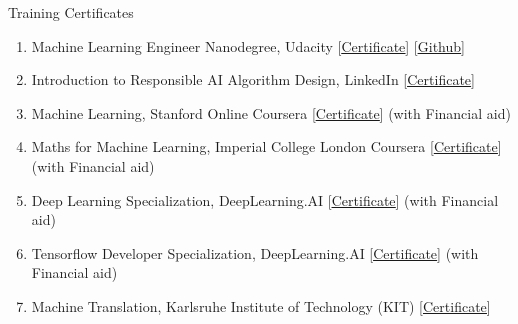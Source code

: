 \documentclass{resume} %
\begin{document}
\begin{rSection}{Training Certificates}    
\begin{enumerate}
    \item Machine Learning Engineer Nanodegree, Udacity [\href{https://graduation.udacity.com/confirm/CECLKGF5}{\underline{Certificate}}] [\href{https://github.com/ThuraAung1601/Machine-Learning-Engineering-Nanodegree}{\underline{Github}}]
    \item Introduction to Responsible AI Algorithm Design, LinkedIn [\href{https://www.linkedin.com/learning/certificates/45762288c64f35ab8b3788a9b6f2f3fb851b8869308f5b2c3fbb4fb570234031}{\underline{Certificate}}]
    \item Machine Learning, Stanford Online Coursera [\href{https://www.coursera.org/account/accomplishments/certificate/UR5GRU4TVGG5}{\underline{Certificate}}] (with Financial aid)
    \item Maths for Machine Learning, Imperial College London Coursera [\href{https://www.coursera.org/account/accomplishments/specialization/certificate/HLKJS7S6CL5U}{\underline{Certificate}}] (with Financial aid)
    \item Deep Learning Specialization, DeepLearning.AI [\href{https://www.coursera.org/account/accomplishments/specialization/certificate/XXKRZ3HYNUL5}{\underline{Certificate}}] (with Financial aid)
    \item Tensorflow Developer Specialization, DeepLearning.AI [\href{https://www.coursera.org/account/accomplishments/specialization/certificate/28ZKMPT9UDHA}{\underline{Certificate}}] (with Financial aid)
    \item Machine Translation, Karlsruhe Institute of Technology (KIT) [\href{https://www.coursera.org/account/accomplishments/certificate/4PYT8DEAC2CG}{\underline{Certificate}}]
\end{enumerate}
\end{rSection}


\end{document}
